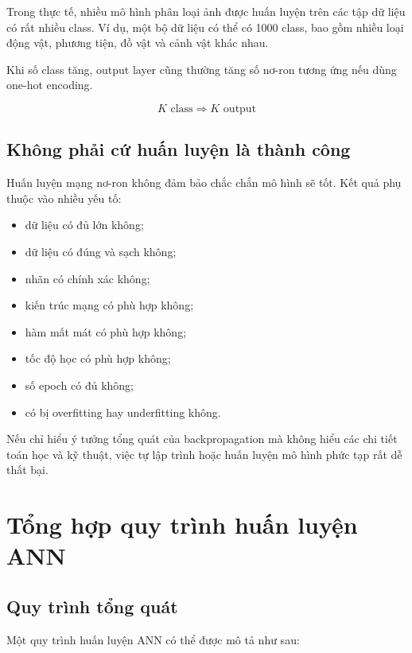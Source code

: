 \documentclass[12pt,a4paper]{report}
\begin{document}
Trong thực tế, nhiều mô hình phân loại ảnh được huấn luyện trên các tập dữ liệu có rất nhiều class. Ví dụ, một bộ dữ liệu có thể có 1000 class, bao gồm nhiều loại động vật, phương tiện, đồ vật và cảnh vật khác nhau.

Khi số class tăng, output layer cũng thường tăng số nơ-ron tương ứng nếu dùng one-hot encoding.

\[
    K \text{ class} \Rightarrow K \text{ output}
\]

\section{Không phải cứ huấn luyện là thành công}

Huấn luyện mạng nơ-ron không đảm bảo chắc chắn mô hình sẽ tốt. Kết quả phụ thuộc vào nhiều yếu tố:

\begin{itemize}
    \item dữ liệu có đủ lớn không;
    \item dữ liệu có đúng và sạch không;
    \item nhãn có chính xác không;
    \item kiến trúc mạng có phù hợp không;
    \item hàm mất mát có phù hợp không;
    \item tốc độ học có phù hợp không;
    \item số epoch có đủ không;
    \item có bị overfitting hay underfitting không.
\end{itemize}

\begin{canhbao}
Nếu chỉ hiểu ý tưởng tổng quát của backpropagation mà không hiểu các chi tiết toán học và kỹ thuật, việc tự lập trình hoặc huấn luyện mô hình phức tạp rất dễ thất bại.
\end{canhbao}

\chapter{Tổng hợp quy trình huấn luyện ANN}

\section{Quy trình tổng quát}

Một quy trình huấn luyện ANN có thể được mô tả như sau:
\end{document}
